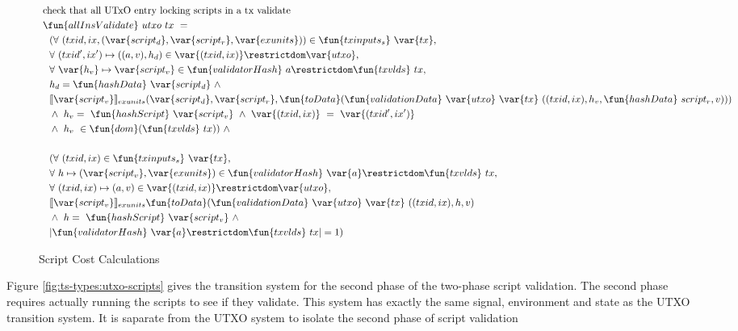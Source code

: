 \begin{figure}[htb]
\begin{align*}
    & \text{check that all UTxO entry locking scripts in a tx validate} \\
    & \fun{allInsValidate}~{utxo}~{tx}~=~ \\
    & ~~(\forall~(txid,ix,(\var{script_d},\var{script_r},\var{exunits})) \in
    \fun{txinputs_s}~\var{tx}, \\
    & ~~ \forall~(txid',ix') \mapsto ((a,v),h_d) \in \var{(txid,ix)}\restrictdom\var{utxo}, \\
    & ~~\forall ~\var{h_v}\mapsto \var{script_v}\in \fun{validatorHash}~{a}\restrictdom\fun{txvlds}~{tx}, \\
    & ~~ h_d = \fun{hashData}~\var{script_d} ~\wedge~ \\
    & ~~ \llbracket \var{script_v} \rrbracket_{exunits} (\var{script_d},\var{script_r},
    \fun{toData}(\fun{validationData}~\var{utxo}~\var{tx}~
      ((txid,ix),h_v,\fun{hashData}~{script_r},v))) \\
    &~~ \wedge~ h_v = ~\fun{hashScript}~\var{script_v}  ~\wedge~ \var{(txid,ix)}~=~\var{(txid',ix')}\\
    & ~~ \wedge~ h_v~\in \fun{dom}( \fun{txvlds}~{tx})) ~\wedge~ \\~\\
    & ~~(\forall~(txid,ix) \in \fun{txinputs_s}~\var{tx}, \\
    & ~~\forall ~h\mapsto (\var{script_v},\var{exunits})\in
     \fun{validatorHash}~\var{a}\restrictdom\fun{txvlds}~{tx}, \\
    & ~~\forall ~(txid,ix) \mapsto (a,v) \in \var{(txid,ix)}\restrictdom\var{utxo}, \\
    & ~~ \llbracket \var{script_v} \rrbracket_{exunits}
    \fun{toData}(\fun{validationData}~\var{utxo}~\var{tx}~
      ((txid,ix),h,v) \\
    & ~~ \wedge~ h = ~\fun{hashScript}~\var{script_v}  ~\wedge~ \\
    & ~~  \vert \fun{validatorHash}~\var{a}\restrictdom\fun{txvlds}~{tx} \vert = 1) \\
  \end{align*}
  \caption{Script Cost Calculations}
  \label{fig:functions:script2}
\end{figure}

Figure \ref{fig:ts-types:utxo-scripts} gives the transition system for the second phase of
the two-phase script validation. The second phase requires actually running
the scripts to see if they validate. This system has exactly the same
signal, environment and state as the UTXO transition system. It is saparate
from the UTXO system to isolate the second phase of script validation

